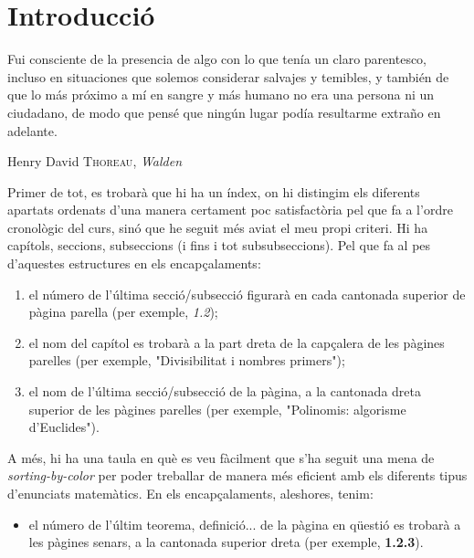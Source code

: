 \chapter*{Introducció}
\setlength{\epigraphwidth}{0.7\textwidth}
\epigraph{Fui consciente de la presencia de algo con lo que tenía un claro parentesco, incluso en situaciones que solemos considerar salvajes y temibles, y también de que lo más próximo a mí en sangre y más humano no era una persona ni un ciudadano, de modo que pensé que ningún lugar podía resultarme extraño en adelante.}{\textnormal{Henry David} \textsc{Thoreau}, \textit{Walden}}

Primer de tot, es trobarà que hi ha un índex, on hi distingim els diferents apartats ordenats d'una manera certament poc satisfactòria pel que fa a l'ordre cronològic del curs, sinó que he seguit més aviat el meu propi criteri. Hi ha capítols, seccions, subseccions (i fins i tot subsubseccions). Pel que fa al pes d'aquestes estructures en els encapçalaments:
\begin{enumerate}
    \item el número de l'última secció/subsecció figurarà en cada cantonada superior de pàgina parella (per exemple, \textit{1.2});
    \item el nom del capítol es trobarà a la part dreta de la capçalera de les pàgines parelles (per exemple, "Divisibilitat i nombres primers");
    \item el nom de l'última secció/subsecció de la pàgina, a la cantonada dreta superior de les pàgines parelles (per exemple, "Polinomis: algorisme d'Euclides").
\end{enumerate}
A més, hi ha una taula en què es veu fàcilment que s'ha seguit una mena de \textit{sorting-by-color} per poder treballar de manera més eficient amb els diferents tipus d'enunciats matemàtics. En els encapçalaments, aleshores, tenim:
\begin{itemize}
    \item el número de l'últim teorema, definició... de la pàgina en qüestió es trobarà a les pàgines senars, a la cantonada superior dreta (per exemple, \textcolor{arsenic}{\textbf{1.2.3}}).
\end{itemize}
